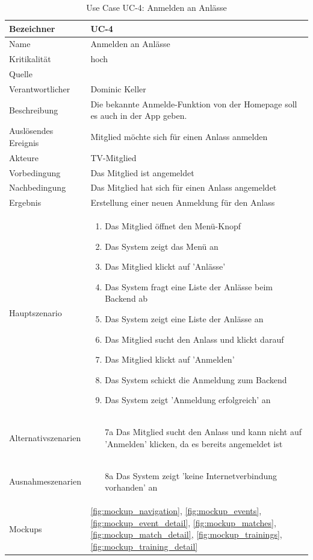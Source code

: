 \begin{table}[ht]
\centering
  \begin{tabular}{ l | p{10cm} }
	\hline
	\rowcolor{gray}
	Bezeichner		&	UC-4\\ \hline
	Name			&	Anmelden an Anlässe\\ \hline
	Kritikalität		&	hoch\\ \hline
	Quelle			&	\glossarmark{Stakeholder}\\ \hline
	Verantwortlicher	&	Dominic Keller\\ \hline
	Beschreibung	&	Die bekannte Anmelde-Funktion von der Homepage soll es auch in der App geben.\\ \hline
	Auslösendes Ereignis&	Mitglied möchte sich für einen Anlass anmelden\\ \hline
	Akteure		&	TV-Mitglied\\ \hline
	Vorbedingung	&	Das Mitglied ist angemeldet\\ \hline
	Nachbedingung	&	Das Mitglied hat sich für einen Anlass angemeldet\\ \hline
	Ergebnis		&	Erstellung einer neuen Anmeldung für den Anlass\\ \hline
	Hauptszenario	&	\begin{enumerate}
					\item Das Mitglied öffnet den Menü-Knopf
					\item Das System zeigt das Menü an
					\item Das Mitglied klickt auf 'Anlässe'
					\item Das System fragt eine Liste der Anlässe beim Backend ab
					\item Das System zeigt eine Liste der Anlässe an
					\item Das Mitglied sucht den Anlass und klickt darauf
					\item Das Mitglied klickt auf 'Anmelden'
					\item Das System schickt die Anmeldung zum Backend
					\item Das System zeigt 'Anmeldung erfolgreich' an
					\end{enumerate}
					\\ \hline
	Alternativszenarien	&	\begin{enumerate}
					\item[7a] Das Mitglied sucht den Anlass und kann nicht auf 'Anmelden' klicken, da es bereits angemeldet ist
					\end{enumerate}
					\\ \hline
	Ausnahmeszenarien&	\begin{enumerate}
					\item[8a] Das System zeigt 'keine Internetverbindung vorhanden' an
					\end{enumerate}
					\\ \hline
	Mockups	 	&	\ref{fig:mockup_navigation}, \ref{fig:mockup_events}, \ref{fig:mockup_event_detail},
					\ref{fig:mockup_matches}, \ref{fig:mockup_match_detail}, \ref{fig:mockup_trainings}, 
					\ref{fig:mockup_training_detail}
  \end{tabular}
   \caption{Use Case UC-4: Anmelden an Anlässe}\label{table:use_case_4}
\end{table}

